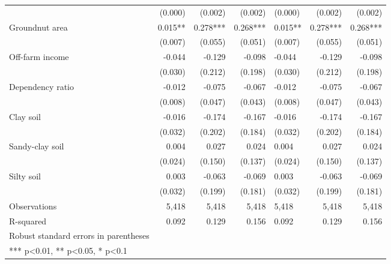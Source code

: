 \documentclass[
]{article}
\begin{document}
\begin{longtable}[t]{lrrrlrr}
 & (0.000) & (0.002) & (0.002) & (0.000) & (0.002) & (0.002)\\
\addlinespace
Groundnut area & 0.015** & 0.278*** & 0.268*** & 0.015** & 0.278*** & 0.268***\\
 & (0.007) & (0.055) & (0.051) & (0.007) & (0.055) & (0.051)\\
Off-farm income & -0.044 & -0.129 & -0.098 & -0.044 & -0.129 & -0.098\\
 & (0.030) & (0.212) & (0.198) & (0.030) & (0.212) & (0.198)\\
Dependency ratio & -0.012 & -0.075 & -0.067 & -0.012 & -0.075 & -0.067\\
\addlinespace
 & (0.008) & (0.047) & (0.043) & (0.008) & (0.047) & (0.043)\\
Clay soil & -0.016 & -0.174 & -0.167 & -0.016 & -0.174 & -0.167\\
 & (0.032) & (0.202) & (0.184) & (0.032) & (0.202) & (0.184)\\
Sandy-clay soil & 0.004 & 0.027 & 0.024 & 0.004 & 0.027 & 0.024\\
 & (0.024) & (0.150) & (0.137) & (0.024) & (0.150) & (0.137)\\
\addlinespace
Silty soil & 0.003 & -0.063 & -0.069 & 0.003 & -0.063 & -0.069\\
 & (0.032) & (0.199) & (0.181) & (0.032) & (0.199) & (0.181)\\
Observations & 5,418 & 5,418 & 5,418 & 5,418 & 5,418 & 5,418\\
R-squared & 0.092 & 0.129 & 0.156 & 0.092 & 0.129 & 0.156\\
Robust standard errors in parentheses &  &  &  &  &  & \\
\addlinespace
*** p<0.01, ** p<0.05, * p<0.1 &  &  &  &  &  & \\*
\end{longtable}
\endgroup{}
\end{document}
